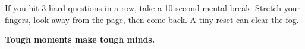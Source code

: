 {\begin{tcolorbox}[
    enhanced,
    colback=funYellowLight,
    colframe=funYellow!60,
    arc=10pt,
    boxrule=1pt,
    left=6mm, right=6mm, top=4mm, bottom=4mm,
]
\vspace{2mm}

If you hit 3 hard questions in a row, take a 10-second mental break. Stretch your fingers, look away from the page, then come back. A tiny reset can clear the fog.
\end{tcolorbox}

\vspace{4mm}

\begin{center}
{\large\bfseries\color{funRedDark} \faFireAlt\hspace{2mm}Tough moments make tough minds.\hspace{2mm}\faFireAlt}
\end{center}

}
\newpage
